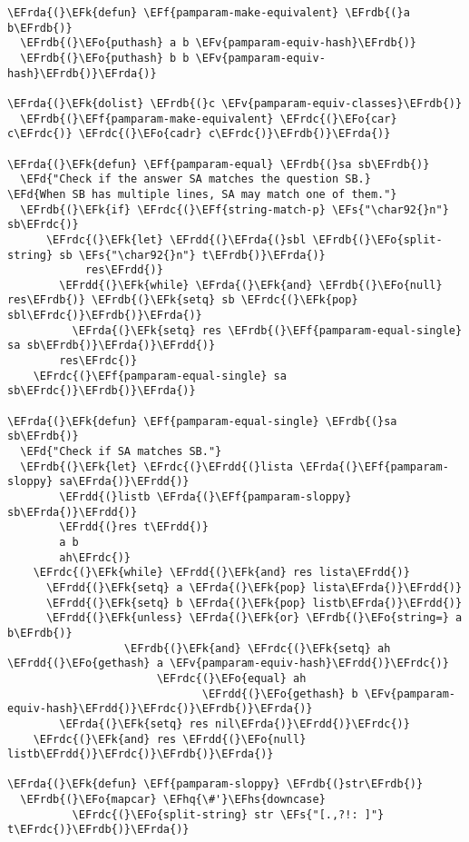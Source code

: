 \documentclass[a4wide,10pt]{article}
\newcommand{\EFs}[1]{\textcolor{EFs}{#1}} %
\newcommand{\EFd}[1]{\textcolor{EFd}{#1}} %
\newcommand{\EFk}[1]{\textcolor{EFk}{#1}} %
\newcommand{\EFf}[1]{\textcolor{EFf}{#1}} %
\newcommand{\EFv}[1]{\textcolor{EFv}{#1}} %
\newcommand{\EFo}[1]{\textcolor{EFo}{#1}} %
\newcommand{\EFhq}[1]{\textcolor{EFhq}{#1}} %
\newcommand{\EFhs}[1]{\textcolor{EFhs}{#1}} %
\newcommand{\EFrda}[1]{\textcolor{EFrda}{#1}} %
\newcommand{\EFrdb}[1]{\textcolor{EFrdb}{#1}} %
\newcommand{\EFrdc}[1]{\textcolor{EFrdc}{#1}} %
\newcommand{\EFrdd}[1]{\textcolor{EFrdd}{#1}} %
\begin{document}
\begin{Code}
\begin{Verbatim}
\EFrda{(}\EFk{defun} \EFf{pamparam-make-equivalent} \EFrdb{(}a b\EFrdb{)}
  \EFrdb{(}\EFo{puthash} a b \EFv{pamparam-equiv-hash}\EFrdb{)}
  \EFrdb{(}\EFo{puthash} b b \EFv{pamparam-equiv-hash}\EFrdb{)}\EFrda{)}

\EFrda{(}\EFk{dolist} \EFrdb{(}c \EFv{pamparam-equiv-classes}\EFrdb{)}
  \EFrdb{(}\EFf{pamparam-make-equivalent} \EFrdc{(}\EFo{car} c\EFrdc{)} \EFrdc{(}\EFo{cadr} c\EFrdc{)}\EFrdb{)}\EFrda{)}

\EFrda{(}\EFk{defun} \EFf{pamparam-equal} \EFrdb{(}sa sb\EFrdb{)}
  \EFd{"Check if the answer SA matches the question SB.}
\EFd{When SB has multiple lines, SA may match one of them."}
  \EFrdb{(}\EFk{if} \EFrdc{(}\EFf{string-match-p} \EFs{"\char92{}n"} sb\EFrdc{)}
      \EFrdc{(}\EFk{let} \EFrdd{(}\EFrda{(}sbl \EFrdb{(}\EFo{split-string} sb \EFs{"\char92{}n"} t\EFrdb{)}\EFrda{)}
            res\EFrdd{)}
        \EFrdd{(}\EFk{while} \EFrda{(}\EFk{and} \EFrdb{(}\EFo{null} res\EFrdb{)} \EFrdb{(}\EFk{setq} sb \EFrdc{(}\EFk{pop} sbl\EFrdc{)}\EFrdb{)}\EFrda{)}
          \EFrda{(}\EFk{setq} res \EFrdb{(}\EFf{pamparam-equal-single} sa sb\EFrdb{)}\EFrda{)}\EFrdd{)}
        res\EFrdc{)}
    \EFrdc{(}\EFf{pamparam-equal-single} sa sb\EFrdc{)}\EFrdb{)}\EFrda{)}

\EFrda{(}\EFk{defun} \EFf{pamparam-equal-single} \EFrdb{(}sa sb\EFrdb{)}
  \EFd{"Check if SA matches SB."}
  \EFrdb{(}\EFk{let} \EFrdc{(}\EFrdd{(}lista \EFrda{(}\EFf{pamparam-sloppy} sa\EFrda{)}\EFrdd{)}
        \EFrdd{(}listb \EFrda{(}\EFf{pamparam-sloppy} sb\EFrda{)}\EFrdd{)}
        \EFrdd{(}res t\EFrdd{)}
        a b
        ah\EFrdc{)}
    \EFrdc{(}\EFk{while} \EFrdd{(}\EFk{and} res lista\EFrdd{)}
      \EFrdd{(}\EFk{setq} a \EFrda{(}\EFk{pop} lista\EFrda{)}\EFrdd{)}
      \EFrdd{(}\EFk{setq} b \EFrda{(}\EFk{pop} listb\EFrda{)}\EFrdd{)}
      \EFrdd{(}\EFk{unless} \EFrda{(}\EFk{or} \EFrdb{(}\EFo{string=} a b\EFrdb{)}
                  \EFrdb{(}\EFk{and} \EFrdc{(}\EFk{setq} ah \EFrdd{(}\EFo{gethash} a \EFv{pamparam-equiv-hash}\EFrdd{)}\EFrdc{)}
                       \EFrdc{(}\EFo{equal} ah
                              \EFrdd{(}\EFo{gethash} b \EFv{pamparam-equiv-hash}\EFrdd{)}\EFrdc{)}\EFrdb{)}\EFrda{)}
        \EFrda{(}\EFk{setq} res nil\EFrda{)}\EFrdd{)}\EFrdc{)}
    \EFrdc{(}\EFk{and} res \EFrdd{(}\EFo{null} listb\EFrdd{)}\EFrdc{)}\EFrdb{)}\EFrda{)}

\EFrda{(}\EFk{defun} \EFf{pamparam-sloppy} \EFrdb{(}str\EFrdb{)}
  \EFrdb{(}\EFo{mapcar} \EFhq{\#'}\EFhs{downcase}
          \EFrdc{(}\EFo{split-string} str \EFs{"[.,?!: ]"} t\EFrdc{)}\EFrdb{)}\EFrda{)}


\end{Verbatim}
\end{Code}
\end{document}
